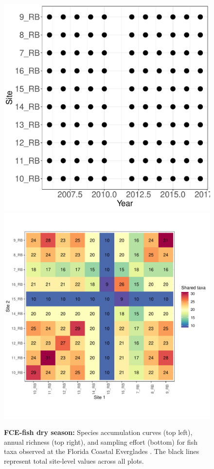 \documentclass[11pt, oneside]{article}
\begin{document}
\begin{figure}[h!]
\includegraphics[scale = 0.4]{fce-fish-RehageDry_spatiotemporal_sampling_effort.pdf}
\includegraphics[scale = 0.4]{fce-fish-RehageDry_spp_shared.pdf}
\caption{{\bf FCE-fish dry season:} Species accumulation curves (top left),  annual richness (top right), and sampling effort (bottom)  for fish taxa observed at the Florida Coastal Everglades . The black lines represent total site-level values across all plots.}
\label{fce-fish-dry}
\end{figure}
\end{document}
